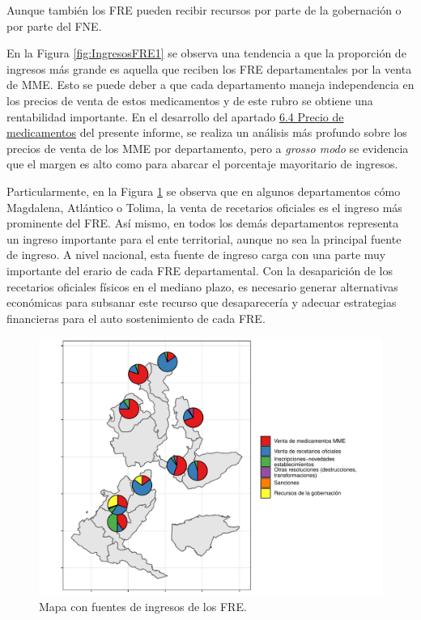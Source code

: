 \documentclass[
]{book}
\begin{document}
Aunque también los FRE pueden recibir recursos por parte de la gobernación o por parte del FNE.

En la Figura \ref{fig:IngresosFRE1} se observa una tendencia a que la proporción de ingresos más grande es aquella que reciben los FRE departamentales por la venta de MME. Esto se puede deber a que cada departamento maneja independencia en los precios de venta de estos medicamentos y de este rubro se obtiene una rentabilidad importante. En el desarrollo del apartado \protect\hyperlink{precioMedicamentos}{6.4 Precio de medicamentos} del presente informe, se realiza un análisis más profundo sobre los precios de venta de los MME por departamento, pero a \emph{grosso modo} se evidencia que el margen es alto como para abarcar el porcentaje mayoritario de ingresos.

Particularmente, en la Figura \ref{fig:IngresosFRE2} se observa que en algunos departamentos cómo Magdalena, Atlántico o Tolima, la venta de recetarios oficiales es el ingreso más prominente del FRE. Así mismo, en todos los demás departamentos representa un ingreso importante para el ente territorial, aunque no sea la principal fuente de ingreso. A nivel nacional, esta fuente de ingreso carga con una parte muy importante del erario de cada FRE departamental. Con la desaparición de los recetarios oficiales físicos en el mediano plazo, es necesario generar alternativas económicas para subsanar este recurso que desaparecería y adecuar estrategias financieras para el auto sostenimiento de cada FRE.

\begin{figure}[th!]

{\centering \includegraphics[width=0.85\linewidth]{InformeFinal_files/figure-latex/IngresosFRE2-1} 

}

\caption{Mapa con fuentes de ingresos de los FRE.}\label{fig:IngresosFRE2}
\end{figure}
\end{document}
